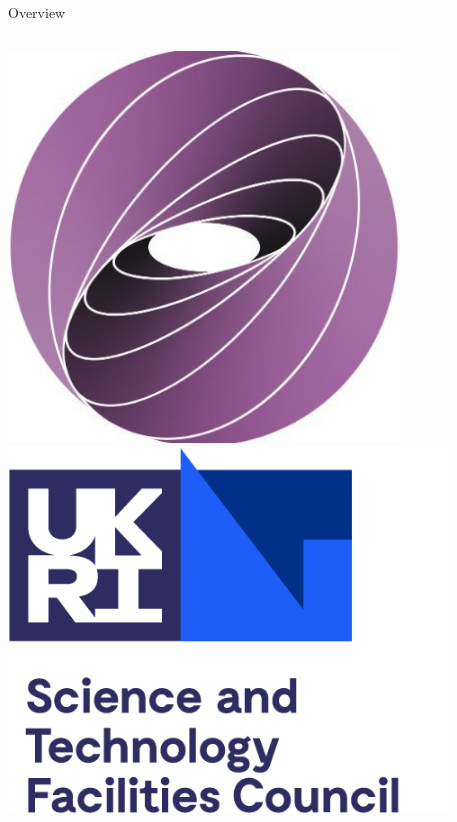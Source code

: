 \documentclass[10pt]{beamer}
\begin{document}
\begin{frame}{Overview}
\begin{columns}
\begin{columns}
            \includegraphics[width=0.8\textwidth]{eschercloud-logo}\\
            \vspace{0.75cm}
            \includegraphics[width=0.9\textwidth]{stfc-logo}
        \end{columns}        
    \end{columns}
  \end{frame}
\end{document}
